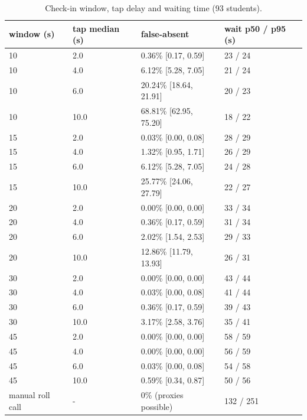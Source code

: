 \begin{table}[t]
\centering
\caption{Check-in window, tap delay and waiting time (93 students).}\label{tab:e05}
\begin{tabular}{llll}
\toprule
window (s) & tap median (s) & false-absent & wait p50 / p95 (s) \\
\midrule
10 & 2.0 & 0.36\% [0.17, 0.59] & 23 / 24 \\
10 & 4.0 & 6.12\% [5.28, 7.05] & 21 / 24 \\
10 & 6.0 & 20.24\% [18.64, 21.91] & 20 / 23 \\
10 & 10.0 & 68.81\% [62.95, 75.20] & 18 / 22 \\
15 & 2.0 & 0.03\% [0.00, 0.08] & 28 / 29 \\
15 & 4.0 & 1.32\% [0.95, 1.71] & 26 / 29 \\
15 & 6.0 & 6.12\% [5.28, 7.05] & 24 / 28 \\
15 & 10.0 & 25.77\% [24.06, 27.79] & 22 / 27 \\
20 & 2.0 & 0.00\% [0.00, 0.00] & 33 / 34 \\
20 & 4.0 & 0.36\% [0.17, 0.59] & 31 / 34 \\
20 & 6.0 & 2.02\% [1.54, 2.53] & 29 / 33 \\
20 & 10.0 & 12.86\% [11.79, 13.93] & 26 / 31 \\
30 & 2.0 & 0.00\% [0.00, 0.00] & 43 / 44 \\
30 & 4.0 & 0.03\% [0.00, 0.08] & 41 / 44 \\
30 & 6.0 & 0.36\% [0.17, 0.59] & 39 / 43 \\
30 & 10.0 & 3.17\% [2.58, 3.76] & 35 / 41 \\
45 & 2.0 & 0.00\% [0.00, 0.00] & 58 / 59 \\
45 & 4.0 & 0.00\% [0.00, 0.00] & 56 / 59 \\
45 & 6.0 & 0.03\% [0.00, 0.08] & 54 / 58 \\
45 & 10.0 & 0.59\% [0.34, 0.87] & 50 / 56 \\
manual roll call & - & 0\% (proxies possible) & 132 / 251 \\
\bottomrule
\end{tabular}
\end{table}

